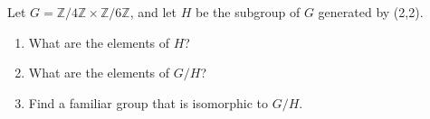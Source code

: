 \documentclass[12pt,letterpaper,boxed]{hmcpset}
\begin{document}
\begin{solution}
\end{solution}

\clearpage

\begin{problem}[10.3.3]
Let $G = \mathbb{Z} / 4\mathbb{Z} \times \mathbb{Z} / 6 \mathbb{Z} $, and let $H$ be the subgroup of $G$ generated by (2,2). 
\begin{enumerate}[label=\alph*]
\item What are the elements of $H$?
\item What are the elements of $G/H$?
\item Find a familiar group that is isomorphic to $G/H$.
\end{enumerate}
\end{problem}

\begin{solution}

\end{solution}
\end{document}
